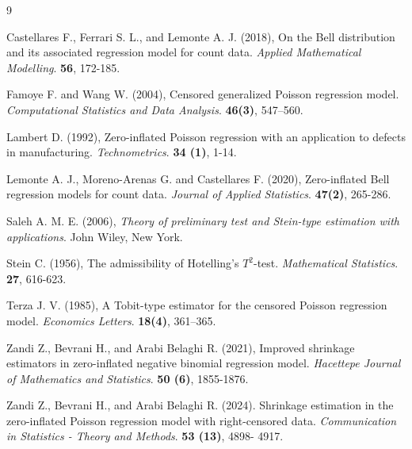 \documentclass[twoside]{article}
\begin{document}
\begin{thebibliography}{9}

Castellares F., Ferrari S. L., and Lemonte A. J. (2018), On the Bell distribution and its associated regression model for count data. {\it Applied Mathematical Modelling}. \textbf{56}, 172-185.

Famoye F. and Wang W. (2004), Censored generalized Poisson regression model. {\it Computational Statistics and Data Analysis}. {\bf 46(3)}, 547--560.

Lambert D. (1992), Zero-inflated Poisson regression with an application to defects in manufacturing. {\it Technometrics}. {\bf 34 (1)}, 1-14.

Lemonte A. J., Moreno-Arenas G. and Castellares F. (2020), Zero-inflated Bell regression models for count data. {\it Journal of Applied Statistics}. {\bf 47(2)}, 265-286.

Saleh A. M. E. (2006), {\it Theory of preliminary test and Stein-type estimation with applications}. John
Wiley, New York.


Stein C. (1956), The admissibility of Hotelling’s $ T^2$-test. {\it Mathematical Statistics}. {\bf 27}, 616-623.

Terza J. V. (1985), A Tobit-type estimator for the censored Poisson regression model. {\it Economics Letters}. {\bf 18(4)}, 361--365.


Zandi Z., Bevrani H., and Arabi Belaghi R. (2021), Improved shrinkage estimators in zero-inflated negative
binomial regression model. {\it Hacettepe Journal of Mathematics and Statistics}. {\bf 50 (6)}, 1855-1876.


Zandi Z., Bevrani H., and Arabi Belaghi R. (2024). Shrinkage estimation in the zero-inflated Poisson regression model with right-censored data. {\it Communication in Statistics - Theory and Methods}. {\bf 53 (13)}, 4898- 4917.

\end{thebibliography}
 
\end{document}
